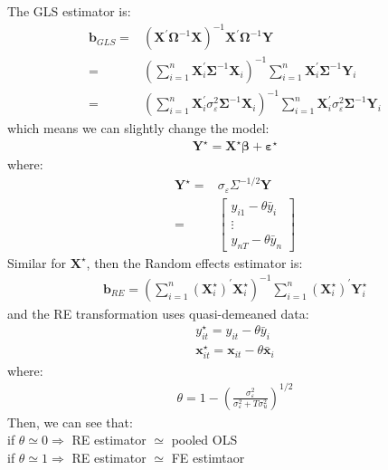 \documentclass{article}
\begin{document}
The GLS estimator is:
	\begin{align*}
		\boldsymbol{b}_{GLS} = &(\boldsymbol{X}^\prime \boldsymbol{\Omega}^{-1} \boldsymbol{X})^{-1} \boldsymbol{X}^\prime \boldsymbol{\Omega}^{-1} \boldsymbol{Y}\\ = &
		(\sum^n_{i=1} \boldsymbol{X}^\prime_i \boldsymbol{\Sigma}^{-1} \boldsymbol{X}_i)^{-1} \sum^n_{i=1} \boldsymbol{X}^\prime_i \boldsymbol{\Sigma}^{-1} \boldsymbol{Y}_i\\ = &
		(\sum^n_{i=1} \boldsymbol{X}^\prime_i \sigma^2_\varepsilon \boldsymbol{\Sigma}^{-1} \boldsymbol{X}_i)^{-1} \sum^n_{i=1} \boldsymbol{X}^\prime_i \sigma^2_\varepsilon \boldsymbol{\Sigma}^{-1} \boldsymbol{Y}_i
	\end{align*}
which means we can slightly change the model:
	\begin{align*}
		\boldsymbol{Y}^\star = \boldsymbol{X}^\star \boldsymbol{\beta} + \boldsymbol{\varepsilon}^\star
	\end{align*}
where:
	\begin{align*}
		\boldsymbol{Y}^\star = & \sigma_\varepsilon \Sigma^{-1/2} \boldsymbol{Y}\\ = &
		\begin{bmatrix}
			y_{i1} - \theta \bar{y}_i\\
			\vdots\\
			y_{nT} - \theta \bar{y}_n
		\end{bmatrix}
	\end{align*}
Similar for $\boldsymbol{X}^\star$, then the Random effects estimator is:
	\begin{align*}
		\boldsymbol{b}_{RE} = (\sum^n_{i=1} (\boldsymbol{X}^\star_i)^\prime \boldsymbol{X}^\star_i)^{-1} \sum^n_{i=1} (\boldsymbol{X}^\star_i)^\prime \boldsymbol{Y}^\star_i
	\end{align*}
and the RE transformation uses quasi-demeaned data:
	\begin{align*}
		y^\star_{it} = y_{it} - \theta\bar{y}_i\\
		\boldsymbol{x}^\star_{it} = \boldsymbol{x}_{it} - \theta\bar{\boldsymbol{x}}_i
	\end{align*}
where:
	\begin{align*}
		\theta = 1 - (\frac{\sigma^2_\varepsilon}{\sigma^2_\varepsilon + T \sigma^2_u})^{1/2}
	\end{align*}
Then, we can see that:\\
\indent if $\theta \simeq 0 \Rightarrow$ RE estimator $\simeq$ pooled OLS\\
\indent if $\theta \simeq 1 \Rightarrow$ RE estimator $\simeq$ FE estimtaor
\end{document}
